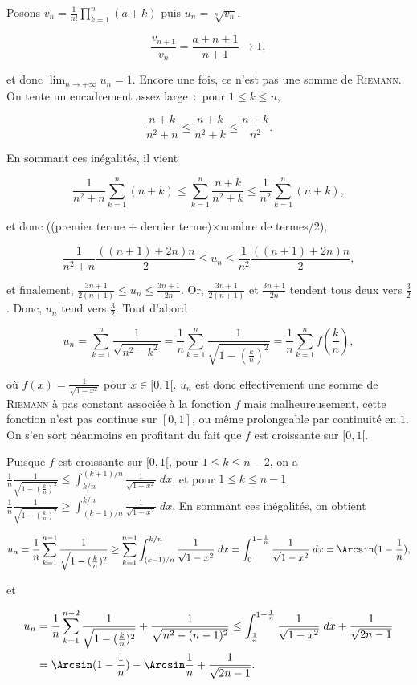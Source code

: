 {{Posons $v_n=\frac{1}{n!}\prod_{k=1}^{n}(a+k)$ puis $u_n=\sqrt[n]{v_n}$.

$$\frac{v_{n+1}}{v_n}=\frac{a+n+1}{n+1}\rightarrow1,$$

et donc $\lim_{n\rightarrow +\infty}u_n=1$.
Encore une fois, ce n'est pas une somme de \textsc{Riemann}. On tente un encadrement assez large~:~pour $1\leq k\leq n$, 

$$\frac{n+k}{n^2+n}\leq\frac{n+k}{n^2+k}\leq\frac{n+k}{n^2}.$$

En sommant ces inégalités, il vient 

$$\frac{1}{n^2+n}\sum_{k=1}^{n}(n+k)\leq\sum_{k=1}^{n}\frac{n+k}{n^2+k}\leq\frac{1}{n^2}\sum_{k=1}^{n}(n+k),$$

et donc ((premier terme + dernier terme)$\times$nombre de termes/2),

$$\frac{1}{n^2+n}\frac{((n+1)+2n)n}{2}\leq u_n\leq\frac{1}{n^2}\frac{((n+1)+2n)n}{2},$$

et finalement, $\frac{3n+1}{2(n+1)}\leq u_n\leq\frac{3n+1}{2n}$. Or, $\frac{3n+1}{2(n+1)}$ et $\frac{3n+1}{2n}$ tendent tous deux vers $\frac{3}{2}$. Donc, $u_n$ tend vers $\frac{3}{2}$.
Tout d'abord

$$u_n=\sum_{k=1}^{n}\frac{1}{\sqrt{n^2-k^2}}=\frac{1}{n}\sum_{k=1}^{n}\frac{1}{\sqrt{1-(\frac{k}{n})^2}}=
\frac{1}{n}\sum_{k=1}^{n}f(\frac{k}{n}),$$ 

où $f(x)=\frac{1}{\sqrt{1-x^2}}$ pour $x\in[0,1[$. $u_n$ est donc effectivement une somme de \textsc{Riemann} à pas constant associée à la fonction $f$ mais malheureusement, cette fonction n'est pas continue sur $[0,1]$, ou même prolongeable par continuité en $1$. On s'en sort néanmoins en profitant du fait que $f$ est croissante sur $[0,1[$.

Puisque $f$ est croissante sur $[0,1[$, pour $1\leq k\leq n-2$, on a $\frac{1}{n}\frac{1}{\sqrt{1-(\frac{k}{n})^2}}\leq\int_{k/n}^{(k+1)/n}\frac{1}{\sqrt{1-x^2}}\;dx$, et pour $1\leq k\leq n-1$, $\frac{1}{n}\frac{1}{\sqrt{1-(\frac{k}{n})^2}}\geq\int_{(k-1)/n}^{k/n}\frac{1}{\sqrt{1-x^2}}\;dx$. En sommant ces inégalités, on obtient

$$u_n=\frac{1}{n}\sum_{k=1}^{n-1}\frac{1}{\sqrt{1-(\frac{k}{n})^2}}\geq\sum_{k=1}^{n-1}\int_{(k-1)/n}^{k/n}\frac{1}{\sqrt{1-x^2}}\;dx=\int_{0}^{1-\frac{1}{n}}\frac{1}{\sqrt{1-x^2}}\;dx=\Arcsin(1-\frac{1}{n}),$$

et 

\begin{align*}\ensuremath
u_n&=\frac{1}{n}\sum_{k=1}^{n-2}\frac{1}{\sqrt{1-(\frac{k}{n})^2}}+\frac{1}{\sqrt{n^2-(n-1)^2}}\leq\int_{\frac{1}{n}}^{1-\frac{1}{n}}\frac{1}{\sqrt{1-x^2}}\;dx+\frac{1}{\sqrt{2n-1}}\\
 &=\Arcsin(1-\frac{1}{n})-\Arcsin\frac{1}{n}+\frac{1}{\sqrt{2n-1}}.
\end{align*}

}}
